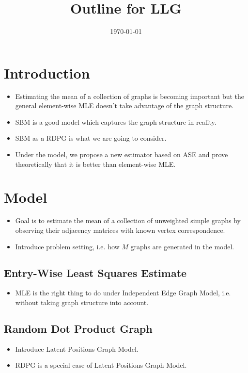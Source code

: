 \documentclass[a4paper]{article}
\title{Outline for LLG}
\date{\today}
\begin{document}
\maketitle

\section{Introduction}

\begin{itemize}
\item Estimating the mean of a collection of graphs is becoming important but the general element-wise MLE doesn't take advantage of the graph structure.
\item SBM is a good model which captures the graph structure in reality.
\item SBM as a RDPG is what we are going to consider.
\item Under the model, we propose a new estimator based on ASE and prove theoretically that it is better than element-wise MLE.
\end{itemize}


\section{Model}

\begin{itemize}
\item Goal is to estimate the mean of a collection of unweighted simple graphs by observing their adjacency matrices with known vertex correspondence.
\item Introduce problem setting, i.e. how $M$ graphs are generated in the model.
\end{itemize}

\subsection{Entry-Wise Least Squares Estimate}
\begin{itemize}
\item MLE is the right thing to do under Independent Edge Graph Model, i.e. without taking graph structure into account.
\end{itemize}

\subsection{Random Dot Product Graph}
\begin{itemize}
\item Introduce Latent Positions Graph Model.
\item RDPG is a special case of Latent Positions Graph Model.
\end{itemize}
\end{document}
